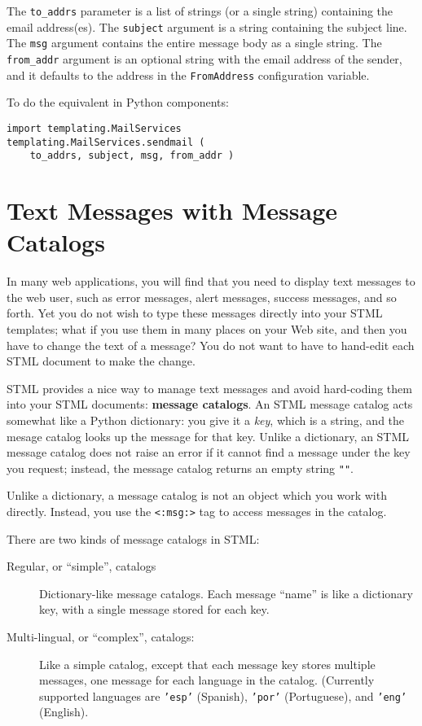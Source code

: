 \documentclass{manual}
\begin{document}
The \texttt{to_addrs} parameter is a list of strings 
(or a single string) containing the email address(es). The
\texttt{subject} argument is a 
string containing the subject line. The \texttt{msg} argument contains
the entire message body as a single string. The \texttt{from_addr} argument
is an optional string with the email address of the sender, 
and it defaults to the address in the
\texttt{FromAddress} configuration variable.


To do the equivalent in Python components:
\begin{verbatim}
import templating.MailServices
templating.MailServices.sendmail ( 
    to_addrs, subject, msg, from_addr )
\end{verbatim}


\chapter{Text Messages with Message Catalogs}
\label{stmlrefmsg}
In many web applications, you will find that you need
to display text messages to the web user, such as 
error messages, alert messages, success messages,
and so forth. Yet you do not wish to type these messages
directly into your STML templates; what if you use them
in many places on your Web site, and then you have to
change the text of a message? You do not want to have
to hand-edit each STML document to make the change.

STML provides a nice way to manage text messages
and avoid hard-coding them into your STML documents:
\textbf{message catalogs}. An STML message catalog acts somewhat
like a Python dictionary: you give it a \emph{key},
which is a string, and the mesage catalog looks up
the message for that key. Unlike a dictionary, an STML
message catalog does not raise an error if it cannot
find a message under the key you request; instead,
the message catalog returns an empty string \texttt{""}.

Unlike a dictionary, a message catalog is not an object
which you work with directly. Instead,
you use the \texttt{<:msg:>} tag to access messages
in the catalog.

There are two kinds of message catalogs in STML:

\begin{description}
\item[Regular, or ``simple'', catalogs] Dictionary-like
message catalogs. Each message ``name'' is like a dictionary
key, with a single message stored for each key.

\item[Multi-lingual, or ``complex'', catalogs:] Like a
simple catalog, except that each message key stores
multiple messages, one message for each language in the
catalog. (Currently supported languages are \texttt{'esp'} (Spanish),
\texttt{'por'} (Portuguese), and \texttt{'eng'} (English). 
\end{description}
\end{document}
